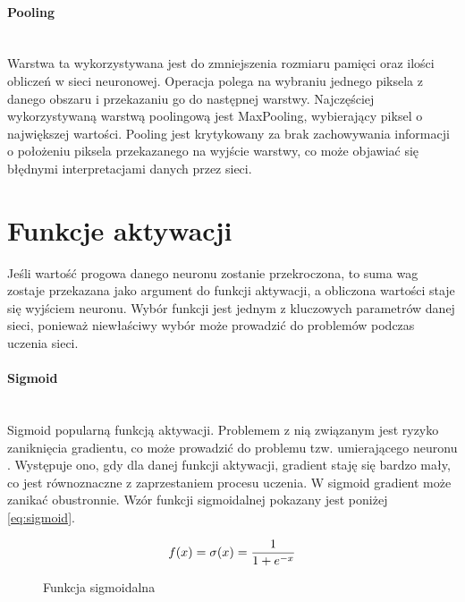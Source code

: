 \paragraph{Pooling} \mbox{}\\
Warstwa ta wykorzystywana jest do zmniejszenia rozmiaru pamięci oraz ilości obliczeń
w sieci neuronowej. Operacja polega na wybraniu jednego piksela z danego obszaru i przekazaniu
go do następnej warstwy. Najczęściej wykorzystywaną warstwą poolingową jest MaxPooling, wybierający
piksel o największej wartości. Pooling jest krytykowany za brak zachowywania informacji
o położeniu piksela przekazanego na wyjście warstwy, co może objawiać się błędnymi
interpretacjami danych przez sieci.

\section{Funkcje aktywacji}

Jeśli wartość progowa danego neuronu zostanie przekroczona, to suma wag zostaje przekazana
jako argument do funkcji aktywacji, a obliczona wartości staje się wyjściem neuronu.
Wybór funkcji jest jednym z kluczowych parametrów danej sieci, ponieważ niewłaściwy wybór
może prowadzić do problemów podczas uczenia sieci.

\paragraph{Sigmoid} \mbox{}\\
Sigmoid popularną funkcją aktywacji. Problemem z nią związanym
jest ryzyko zaniknięcia gradientu, co może prowadzić do problemu tzw. umierającego
neuronu \cite{activationFunctions}. Występuje ono, gdy dla danej funkcji aktywacji,
gradient staję się bardzo mały, co jest równoznaczne z zaprzestaniem procesu uczenia.
W sigmoid gradient może zanikać obustronnie. Wzór funkcji sigmoidalnej pokazany jest poniżej \ref{eq:sigmoid}.
\begin{figure}[h!]
\renewcommand{\figurename}{Wzór}%
\begin{equation} \label{eq:sigmoid}
f(x) = \sigma(x) = \frac{1}{1 + e^{-x}} \\
\end{equation}
\caption{Funkcja sigmoidalna}
\end{figure}

